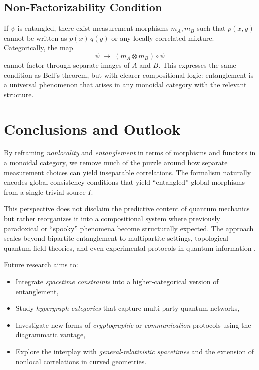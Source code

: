 \documentclass[12pt]{article}
\begin{document}
\subsection{Non-Factorizability Condition}
If $\psi$ is entangled, there exist measurement morphisms $m_A, m_B$ such that $p(x,y)$ cannot be written as $p(x) \, q(y)$ or any locally correlated mixture. Categorically, the map
\[
\psi \;\longrightarrow\; (m_A \otimes m_B)\circ \psi
\]
cannot factor through separate images of $A$ and $B$. This expresses the same condition as Bell’s theorem, but with clearer compositional logic: entanglement is a universal phenomenon that arises in any monoidal category with the relevant structure.

\vspace{1em}

\section{Conclusions and Outlook}
By reframing \emph{nonlocality} and \emph{entanglement} in terms of morphisms and functors in a monoidal category, we remove much of the puzzle around how separate measurement choices can yield inseparable correlations. The formalism naturally encodes global consistency conditions that yield ``entangled'' global morphisms from a single trivial source $I$. 

This perspective does not disclaim the predictive content of quantum mechanics but rather reorganizes it into a compositional system where previously paradoxical or “spooky” phenomena become structurally expected. The approach scales beyond bipartite entanglement to multipartite settings, topological quantum field theories, and even experimental protocols in quantum information \cite{CoeckeKissinger}.

Future research aims to:
\begin{itemize}
    \item Integrate \emph{spacetime constraints} into a higher-categorical version of entanglement,
    \item Study \emph{hypergraph categories} that capture multi-party quantum networks,
    \item Investigate new forms of \emph{cryptographic} or \emph{communication} protocols using the diagrammatic vantage,
    \item Explore the interplay with \emph{general-relativistic spacetimes} and the extension of nonlocal correlations in curved geometries.
\end{itemize}
\end{document}
